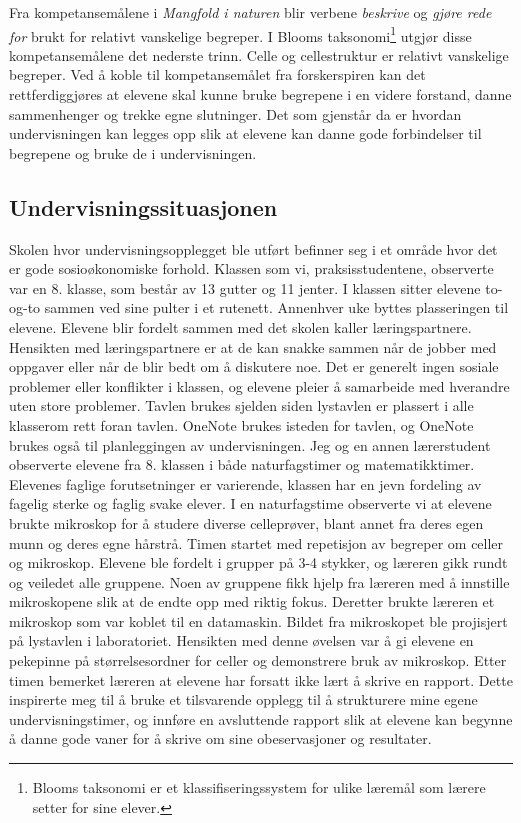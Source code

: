 \documentclass[main.tex]{subfiles}
\begin{document}
Fra kompetansemålene i \emph{Mangfold i naturen} blir verbene \emph{beskrive} og \emph{gjøre rede 
for} brukt for relativt vanskelige begreper. I Blooms taksonomi\footnote{Blooms taksonomi er et 
klassifiseringssystem for ulike læremål som lærere setter for sine elever.} utgjør disse 
kompetansemålene det nederste trinn. Celle og cellestruktur er relativt vanskelige begreper. Ved å 
koble til kompetansemålet fra forskerspiren kan det rettferdiggjøres at elevene skal kunne bruke 
begrepene i en videre forstand, danne sammenhenger og trekke egne slutninger.
Det som gjenstår da er hvordan undervisningen kan legges opp slik at 
elevene kan danne gode forbindelser til begrepene og bruke de i undervisningen.

\subsection*{Undervisningssituasjonen}
Skolen hvor undervisningsopplegget ble utført befinner seg i et område hvor det er gode 
sosioøkonomiske forhold. Klassen som vi, praksisstudentene, observerte var en 8. klasse, som består 
av 13 gutter og 11 jenter. I klassen sitter elevene to-og-to sammen ved sine pulter i et rutenett. 
Annenhver uke byttes plasseringen til elevene. Elevene blir fordelt sammen med det skolen kaller 
læringspartnere. Hensikten med læringspartnere er at de kan snakke sammen når de jobber med oppgaver 
eller når de blir bedt om å diskutere noe.  Det er generelt ingen sosiale problemer 
eller konflikter i klassen, og elevene pleier å samarbeide med hverandre uten store problemer. Tavlen 
brukes sjelden siden lystavlen er plassert i alle klasserom rett foran tavlen. OneNote brukes isteden 
for tavlen, og OneNote brukes også til planleggingen av undervisningen.
\newline
\newline
Jeg og en annen lærerstudent observerte elevene fra 8. klassen i både naturfagstimer og 
matematikktimer. Elevenes faglige forutsetninger er varierende, klassen har en jevn fordeling av 
fagelig sterke og faglig svake elever. I en naturfagstime observerte vi at elevene brukte mikroskop 
for å studere diverse celleprøver, blant annet fra deres egen munn og deres egne hårstrå. Timen 
startet med repetisjon av begreper om celler og mikroskop. Elevene ble fordelt i grupper på 3-4 
stykker, og læreren gikk rundt og veiledet alle gruppene. Noen av gruppene fikk 
hjelp fra læreren med å innstille mikroskopene slik at de endte opp med riktig fokus. Deretter brukte 
læreren et mikroskop som var koblet til en datamaskin. Bildet fra mikroskopet ble projisjert på 
lystavlen i laboratoriet. Hensikten med denne øvelsen var å gi elevene en pekepinne på 
størrelsesordner for celler og demonstrere bruk av mikroskop. Etter timen bemerket læreren at 
elevene har forsatt ikke lært å skrive en rapport. Dette inspirerte meg til å bruke et tilsvarende 
opplegg til å strukturere mine egene undervisningstimer, og innføre en avsluttende rapport 
slik at elevene kan begynne å danne gode vaner for å skrive om sine obeservasjoner og resultater.
\end{document}
